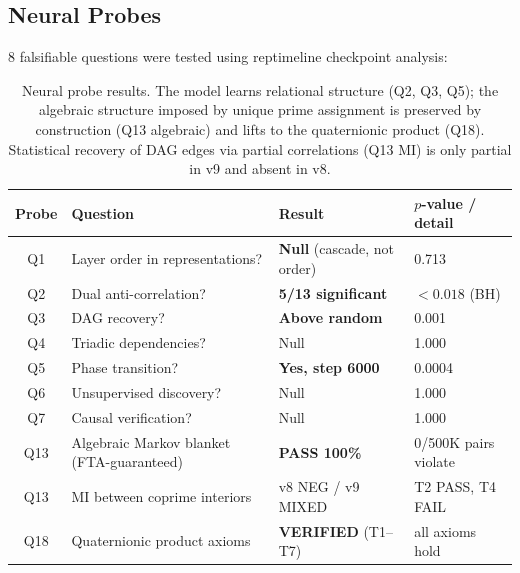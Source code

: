 \documentclass[11pt, a4paper]{article}
\begin{document}
\subsection{Neural Probes}

8 falsifiable questions were tested using reptimeline checkpoint analysis:

\begin{table}[ht]
\centering
\footnotesize
\begin{tabular}{clll}
\toprule
\textbf{Probe} & \textbf{Question} & \textbf{Result} & \textbf{$p$-value / detail} \\
\midrule
Q1  & Layer order in representations?           & \textbf{Null} (cascade, not order)  & 0.713 \\
Q2  & Dual anti-correlation?                    & \textbf{5/13 significant}           & $<0.018$ (BH) \\
Q3  & DAG recovery?                             & \textbf{Above random}               & 0.001 \\
Q4  & Triadic dependencies?                     & Null                                & 1.000 \\
Q5  & Phase transition?                         & \textbf{Yes, step 6000}             & 0.0004 \\
Q6  & Unsupervised discovery?                   & Null                                & 1.000 \\
Q7  & Causal verification?                      & Null                                & 1.000 \\
Q13 & Algebraic Markov blanket (FTA-guaranteed) & \textbf{PASS 100\%}                 & 0/500K pairs violate \\
Q13 & MI between coprime interiors              & v8 NEG / v9 MIXED                   & T2 PASS, T4 FAIL \\
Q18 & Quaternionic product axioms               & \textbf{VERIFIED} (T1--T7)          & all axioms hold \\
\bottomrule
\end{tabular}
\caption{Neural probe results. The model learns relational structure (Q2, Q3, Q5); the algebraic structure imposed by unique prime assignment is preserved by construction (Q13 algebraic) and lifts to the quaternionic product (Q18). Statistical recovery of DAG edges via partial correlations (Q13 MI) is only partial in v9 and absent in v8.}
\label{tab:probes}
\end{table}
\end{document}
